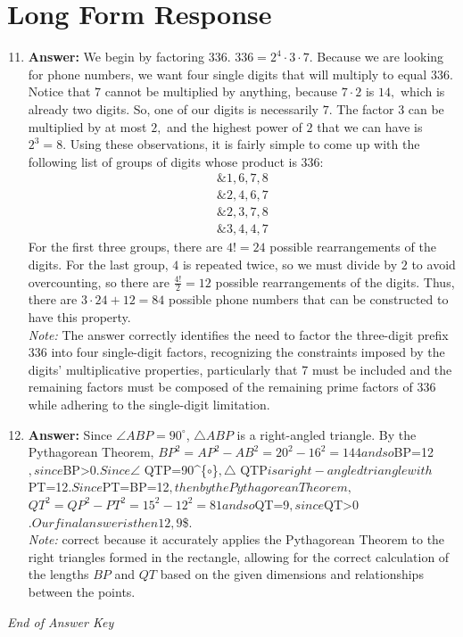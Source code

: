 \documentclass[12pt]{article}
\begin{document}
\section*{Long Form Response}
\begin{enumerate}[label=\arabic*.]
\setcounter{enumi}{10}
\item \textbf{Answer:} We begin by factoring $336$. $336 = 2^4 \cdot 3 \cdot 7.$ Because we are looking for phone numbers, we want four single digits that will multiply to equal $336.$ Notice that $7$ cannot be multiplied by anything, because $7 \cdot 2$ is $14,$ which is already two digits. So, one of our digits is necessarily $7.$ The factor $3$ can be multiplied by at most $2,$ and the highest power of $2$ that we can have is $2^3 = 8.$ Using these observations, it is fairly simple to come up with the following list of groups of digits whose product is $336:$ \begin{align*} \&1, 6, 7, 8\\ \&2, 4, 6, 7\\ \&2, 3, 7, 8 \\ \&3, 4, 4, 7 \end{align*}For the first three groups, there are $4! = 24$ possible rearrangements of the digits. For the last group, $4$ is repeated twice, so we must divide by $2$ to avoid overcounting, so there are $\frac{4!}{2} = 12$ possible rearrangements of the digits. Thus, there are $3 \cdot 24 + 12 = \boxed{84}$ possible phone numbers that can be constructed to have this property.
\\ \textit{Note:} The answer correctly identifies the need to factor the three-digit prefix 336 into four single-digit factors, recognizing the constraints imposed by the digits' multiplicative properties, particularly that 7 must be included and the remaining factors must be composed of the remaining prime factors of 336 while adhering to the single-digit limitation.
\item \textbf{Answer:} Since $\angle ABP=90^{\circ}$, $\triangle ABP$ is a right-angled triangle. By the Pythagorean Theorem, $BP^2=AP^2-AB^2=20^2-16^2=144$$ and so $BP=12$, since $BP\textgreater{}0$. Since $\ensuremath{\angle} QTP=90^\{\ensuremath{\circ}\}$, $\ensuremath{\triangle} QTP$ is a right-angled triangle with $PT=12$. Since $PT=BP=12$, then by the Pythagorean Theorem, $$QT^2=QP^2-PT^2=15^2-12^2 = 81$$ and so $QT=9$, since $QT\textgreater{}0$. Our final answer is then $\ensuremath{\boxed{12,9}}\$.
\\ \textit{Note:} correct because it accurately applies the Pythagorean Theorem to the right triangles formed in the rectangle, allowing for the correct calculation of the lengths \(BP\) and \(QT\) based on the given dimensions and relationships between the points.
\end{enumerate}

\vfill
\noindent\textit{End of Answer Key}
\end{document}
